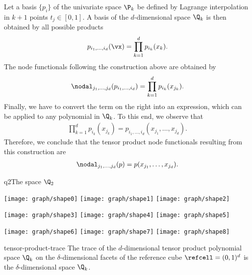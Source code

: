 \begin{example}
  Let a basis $\{p_i\}$ of the univariate space $\P_k$ be defined by
  Lagrange interpolation in $k+1$ points $t_j \in [0,1]$. A basis of
  the $d$-dimensional space $\Q_k$ is then obtained by all possible
  products
  \begin{gather*}
    p_{i_1,\dots,i_d}(\vx) = \prod_{k=1}^d p_{i_k}(x_k).
  \end{gather*}
  The node functionals following the construction above are obtained by
  \begin{gather*}
    \nodal_{j_1,\dots,j_d}(p_{i_1,\dots,i_d}) = \prod_{k=1}^d p_{i_k}(x_{j_k}).
  \end{gather*}
  Finally, we have to convert the term on the right into an
  expression, which can be applied to any polynomial in $\Q_k$. To
  this end, we observe that
  \begin{gather*}
    \prod_{k=1}^d p_{i_k}(x_{j_k}) = p_{i_1,\dots,i_d}(x_{j_1},\dots,x_{j_d}).
  \end{gather*}
  Therefore, we conclude that the tensor product node functionals
  resulting from this construction are
  \begin{gather*}
    \nodal_{j_1,\dots,j_d}(p) = p(x_{j_1},\dots,x_{j_d}).
  \end{gather*}
\end{example}

\begin{Example*}{q2}{The space $\Q_2$}
    \begin{center}
    \texttt{[image: graph/shape0]}
    \texttt{[image: graph/shape1]}
    \texttt{[image: graph/shape2]}

    \texttt{[image: graph/shape3]}
    \texttt{[image: graph/shape4]}
    \texttt{[image: graph/shape5]}

    \texttt{[image: graph/shape6]}
    \texttt{[image: graph/shape7]}
    \texttt{[image: graph/shape8]}
  \end{center}
\end{Example*}


\begin{Lemma}{tensor-product-trace}
  The trace of the $d$-dimensional tensor product polynomial space
  $\Q_k$ on the $\delta$-dimensional facets of the reference cube
  $\refcell = (0,1)^d$ is the $\delta$-dimensional space $\Q_k$.

\end{Lemma}


